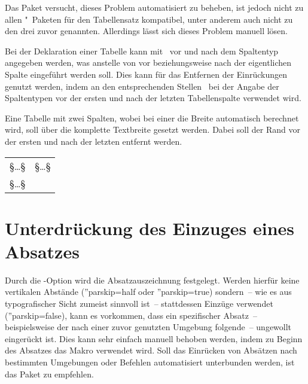Das Paket  versucht, dieses Problem automatisiert zu 
beheben, ist jedoch nicht zu allen "~Paketen für den 
Tabellensatz kompatibel, unter anderem auch nicht zu den drei zuvor genannten. 
Allerdings lässt sich dieses Problem manuell lösen. 

Bei der Deklaration einer Tabelle kann mit~\MPValue{\dots} vor und 
nach dem Spaltentyp angegeben werden, was anstelle von  vor 
beziehungsweise nach der eigentlichen Spalte eingeführt werden soll. Dies kann 
für das Entfernen der Einrückungen genutzt werden, indem an den entsprechenden 
Stellen~ bei der Angabe der Spaltentypen vor der ersten und 
nach der letzten Tabellenspalte verwendet wird.
%
\begin{Example}
Eine Tabelle mit zwei Spalten, wobei bei einer die Breite automatisch berechnet 
wird, soll über die komplette Textbreite gesetzt werden. Dabei soll der Rand 
vor der ersten und nach der letzten entfernt werden.
\begin{Code}[escapechar=§]
\begin{tabularx}{\textwidth}{@{}lX@{}}
§\dots§ & §\dots§ \tabularnewline
§\dots§
\end{tabularx}
\end{Code}
\end{Example}



\section{%
  Unterdrückung des Einzuges eines Absatzes%
}

Durch die \KOMAScript-Option  wird
die Absatzauszeichnung  festgelegt. Werden hierfür keine vertikalen Abstände 
(\Option''{parskip=half} oder \Option''{parskip=true}) sondern~-- wie es aus 
typografischer Sicht zumeist sinnvoll ist~-- stattdessen Einzüge verwendet 
(\Option''{parskip=false}), kann es vorkommen, dass ein spezifischer Absatz~-- 
beispielsweise der nach einer zuvor genutzten Umgebung folgende~-- ungewollt 
eingerückt ist. Dies kann sehr einfach manuell behoben werden, indem zu Beginn 
des Absatzes das Makro  verwendet wird. Soll das Einrücken von 
Absätzen nach bestimmten Umgebungen oder Befehlen automatisiert unterbunden 
werden, ist das Paket  zu empfehlen.



